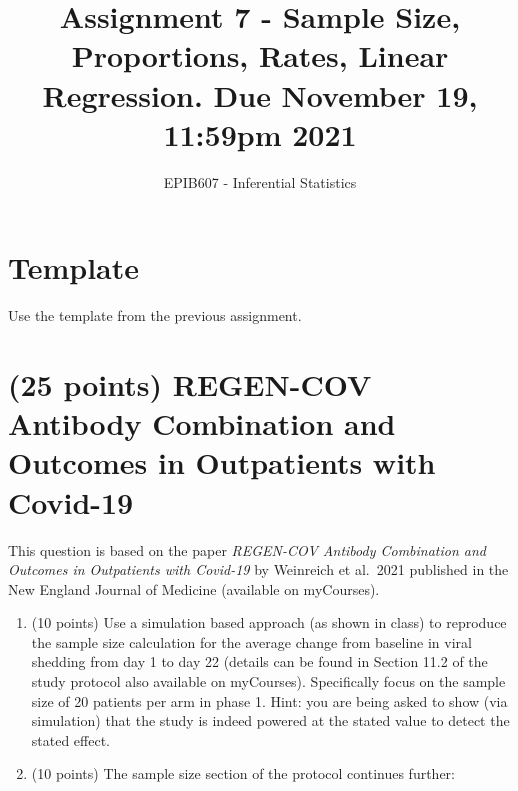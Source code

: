 \documentclass[letterpaper,12pt,twoside,]{pinp}
\title{Assignment 7 - Sample Size, Proportions, Rates, Linear
Regression. Due November 19, 11:59pm 2021}
\author[a]{EPIB607 - Inferential Statistics}
\affil[a]{Fall 2021, McGill University}
\begin{document}
\verticaladjustment{-2pt}

\maketitle
\thispagestyle{firststyle}



\hypertarget{template}{%
\section*{Template}\label{template}}

Use the template from the previous assignment.

\hypertarget{points-regen-cov-antibody-combination-and-outcomes-in-outpatients-with-covid-19}{%
\section{(25 points) REGEN-COV Antibody Combination and Outcomes in
Outpatients with
Covid-19}\label{points-regen-cov-antibody-combination-and-outcomes-in-outpatients-with-covid-19}}

This question is based on the paper \emph{REGEN-COV Antibody Combination
and Outcomes in Outpatients with Covid-19} by Weinreich et al.~2021
published in the New England Journal of Medicine (available on
myCourses).

\begin{enumerate}
\def\labelenumi{\alph{enumi})}
\item
  (10 points) Use a simulation based approach (as shown in class) to
  reproduce the sample size calculation for the average change from
  baseline in viral shedding from day 1 to day 22 (details can be found
  in Section 11.2 of the study protocol also available on myCourses).
  Specifically focus on the sample size of 20 patients per arm in phase
  1. Hint: you are being asked to show (via simulation) that the study
  is indeed powered at the stated value to detect the stated effect.
\item
  (10 points) The sample size section of the protocol continues further:
\end{enumerate}
\end{document}
